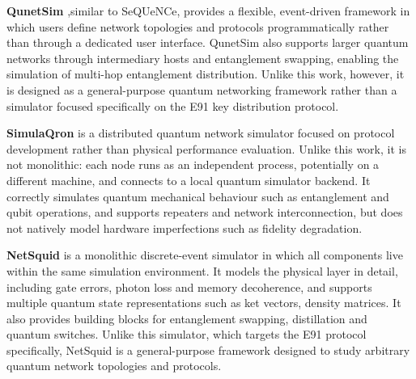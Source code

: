 \textbf{QunetSim} \cite{diadamo2021qunetsim},similar to SeQUeNCe, provides a flexible, event-driven framework in which users define network topologies and protocols programmatically rather than through a dedicated user interface. QunetSim also supports larger quantum networks through intermediary hosts and entanglement swapping, enabling the simulation of multi-hop entanglement distribution. Unlike this work, however, it is designed as a general-purpose quantum networking framework rather than a simulator focused specifically on the E91 key distribution protocol.

\textbf{SimulaQron} \cite{Dahlberg2019SimulaQron} is a distributed quantum network simulator focused on protocol development rather than physical performance evaluation. Unlike this work, it is not monolithic: each node runs as an independent process, potentially on a different machine, and connects to a local quantum simulator backend. It correctly simulates quantum mechanical behaviour such as entanglement and qubit operations, and supports repeaters and network interconnection, but does not natively model hardware imperfections such as fidelity degradation. 

\textbf{NetSquid} \cite{Coopmans2021NetSquid} is a monolithic discrete-event simulator in which all components live within the same simulation environment. It models the physical layer in detail, including gate errors, photon loss and memory decoherence, and supports multiple quantum state representations such as ket vectors, density matrices. It also provides building blocks for entanglement swapping, distillation and quantum switches. Unlike this simulator, which targets the E91 protocol specifically, NetSquid is a general-purpose framework designed to study arbitrary quantum network topologies and protocols.
